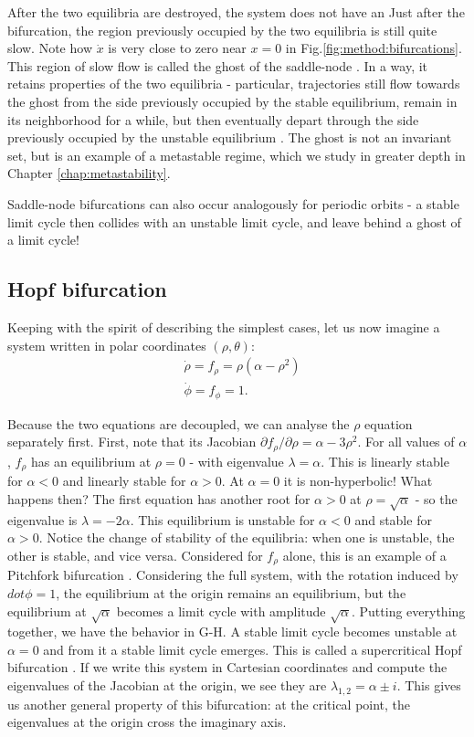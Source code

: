 After the two equilibria are destroyed, the system does not have an
Just after the bifurcation, the region previously occupied by the two equilibria is still quite slow. Note how $\dot{x}$ is very close to zero near $x=0$ in Fig.\ref{fig:method:bifurcations}. This region of slow flow is called the ghost of the saddle-node \cite{strogatz2002nonlinear}. In a way, it retains properties of the two equilibria - particular, trajectories still flow towards the ghost from the side previously occupied by the stable equilibrium, remain in its neighborhood for a while, but then eventually depart through the side previously occupied by the unstable equilibrium \cite{koch2024ghost}. The ghost is not an invariant set, but is an example of a metastable regime, which we study in greater depth in Chapter \ref{chap:metastability}.


Saddle-node bifurcations can also occur analogously for periodic orbits \cite{kuznetsov} - a stable limit cycle then collides with an unstable limit cycle, and leave behind a ghost of a limit cycle!

\subsection{Hopf bifurcation}
Keeping with the spirit of describing the simplest cases, let us now imagine a system written in polar coordinates $(\rho, \theta)$:
% 
\begin{align}\label{eq:hopf}
    &\dot{\rho} = f_\rho = \rho(\alpha - \rho^2) \\ 
    &\dot{\phi} = f_\phi = 1.
\end{align}

Because the two equations are decoupled, we can analyse the $\rho$ equation separately first. First, note that its Jacobian $\partial f_\rho / \partial \rho = \alpha - 3\rho^2$. For all values of $\alpha$, $f_\rho$ has an equilibrium at $\rho=0$ - with eigenvalue $\lambda = \alpha$. This is linearly stable for $\alpha<0$ and linearly stable for $\alpha>0$. At $\alpha=0$ it is non-hyperbolic! What happens then? The first equation has another root for $\alpha > 0$ at $\rho = \sqrt{\alpha}$ - so the eigenvalue is $\lambda = -2\alpha$. This equilibrium is unstable for $\alpha < 0$ and stable for $\alpha > 0$. Notice the change of stability of the equilibria: when one is unstable, the other is stable, and vice versa. Considered for $f_\rho$ alone, this is an example of a Pitchfork bifurcation \cite{kuznetsov}. Considering the full system, with the rotation induced by $dot{\phi} = 1$, the equilibrium at the origin remains an equilibrium, but the equilibrium at $\sqrt{\alpha}$ becomes a limit cycle with amplitude $\sqrt{\alpha}$. Putting everything together, we have the behavior in G-H. A stable limit cycle becomes unstable at $\alpha = 0$ and from it a stable limit cycle emerges. This is called a supercritical Hopf bifurcation \cite{kuznetsov}.
If we write this system in Cartesian coordinates and compute the eigenvalues of the Jacobian at the origin, we see they are $\lambda_{1,2} = \alpha \pm i$. This gives us another general property of this bifurcation: at the critical point, the eigenvalues at the origin cross the imaginary axis.

